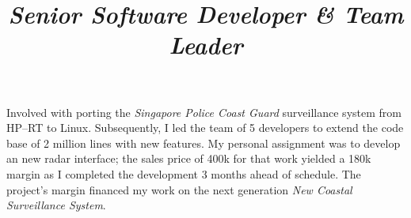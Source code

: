 \documentclass[overlapped,line,letterpaper]{res}
\begin{document}
\begin{resume}
  \newpage
  
  \title{\em Senior Software Developer \& Team Leader}
  \begin{position}
    Involved with porting the {\em Singapore Police Coast Guard} surveillance
    system from HP--RT to Linux. Subsequently, I led the team of 5 developers to
    extend the code base of 2 million lines with new features. My
    personal assignment was to develop an new radar interface; the sales price
    of 400k for that work yielded a 180k margin as I completed the development 3
    months ahead of schedule. The project's margin financed my work on the
    next generation {\em New Coastal Surveillance System}.
  \end{position}











\end{resume}
\end{document}

